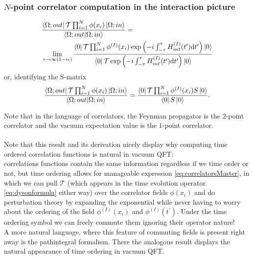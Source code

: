 \subsubsection{$N$-point correlator computation in the interaction picture}
\begin{mybox}{}
	\begin{align}
		\label{eq:correlatorsMaster}
		& \frac{\bra{\Omega;out} \mathcal{T} \prod_{i=1}^{N} \phi(x_i) \ket{\Omega;in}}{\braket{\Omega;out}{\Omega;in}}=\\
		&\lim_{\tau\rightarrow \infty(1-i \epsilon)} \frac{\bra{0} \mathcal{T} \prod_{i=1}^{N} \phi^{(I)}(x_i) \exp \left(-i \int_{-\tau}^{\tau} H^{(I)}_{int}(t^\prime) \mathrm{d} t^\prime \right) \ket{0}}{\bra{0} \mathcal{T} \exp \left(-i \int_{-\tau}^{\tau} H^{(I)}_{int} (t^\prime) \mathrm{d} t^\prime \right) \ket{0}}\nonumber
	\end{align}
or, identifying the S-matrix
\begin{equation}
	\frac{\bra{\Omega;out} \mathcal{T}\prod_{i=1}^{N} \phi(x_i) \ket{\Omega;in}}{\braket{\Omega;out}{\Omega;in}} = \frac{\bra{0}\mathcal{T} \prod_{i=1}^{N} \phi^{(I)} (x_i) S\ket{0}}{\bra{0}S\ket{0}}.
\end{equation}
\end{mybox}
Note that in the language of correlators, the Feynman propagator is the $2$-point correlator and the vacuum expectation value is the $1$-point correlator.\\
\\
Note that this result and its derivation nicely display why computing time ordered correlation functions is natural in vacuum QFT: \\
correlations functions contain the same information regardless if we time order or not, but time ordering allows for manageable expression \ref{eq:correlatorsMaster}, in which we can pull $\mathcal{T}$ (which appears in the time evolution operator \ref{eq:dysonformula} either way) over the correlator fields $\phi(x_i)$ and do perturbation theory by expanding the exponential while never having to worry about the ordering of the field $\phi^{(I)}(x_i)$ and $\phi^{(I)}(t^\prime)$. Under the time ordering symbol we can freely commute them ignoring their operator nature! \\
A more natural language, where this feature of commuting fields is present right away is the pathintegral formalism. There the analogous result  displays the natural appearance of time ordering in vacuum QFT.\\
